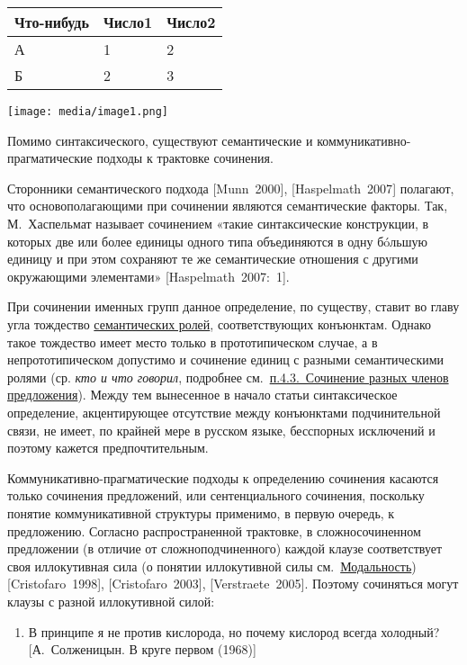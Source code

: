 \begin{longtable}[]{@{}lll@{}}
\toprule
Что-нибудь & Число1 & Число2 \\
\midrule
\endhead
А & 1 & 2 \\
Б & 2 & 3 \\
\bottomrule
\end{longtable}

\texttt{[image: media/image1.png]}

Помимо синтаксического, существуют семантические и
коммуникативно-прагматические подходы к трактовке сочинения.

Сторонники семантического подхода {[}Munn~2000{]}, {[}Haspelmath~2007{]}
полагают, что основополагающими при сочинении являются семантические
факторы. Так, М.~Хаспельмат называет сочинением «такие синтаксические
конструкции, в которых две или более единицы одного типа объединяются в
одну бóльшую единицу и при этом сохраняют те же семантические отношения
с другими окружающими элементами» {[}Haspelmath~2007:~1{]}.

При сочинении именных групп данное определение, по существу, ставит во
главу угла тождество \underline{семантических ролей}, соответствующих
конъюнктам. Однако такое тождество имеет место только в прототипическом
случае, а в непрототипическом допустимо и сочинение единиц с разными
семантическими ролями (ср. \emph{кто и что говорил}, подробнее
см.~\underline{п.4.3.~Сочинение разных членов предложения}). Между тем
вынесенное в начало статьи синтаксическое определение, акцентирующее
отсутствие между конъюнктами подчинительной связи, не имеет, по крайней
мере в русском языке, бесспорных исключений и поэтому кажется
предпочтительным.

Коммуникативно-прагматические подходы к определению сочинения касаются
только сочинения предложений, или сентенциального сочинения, поскольку
понятие коммуникативной структуры применимо, в первую очередь, к
предложению. Согласно распространенной трактовке, в сложносочиненном
предложении (в отличие от сложноподчиненного) каждой клаузе
соответствует своя иллокутивная сила (о понятии иллокутивной силы
см.~\underline{Модальность}) {[}Cristofaro~1998{]},
{[}Cristofaro~2003{]}, {[}Verstraete~2005{]}. Поэтому сочиняться могут
клаузы с разной иллокутивной силой:

\begin{enumerate}
\def\labelenumi{(\arabic{enumi})}
\item
  В принципе я не против кислорода, но почему кислород всегда холодный?
  {[}А.~Солженицын. В круге первом (1968){]}
\end{enumerate}

